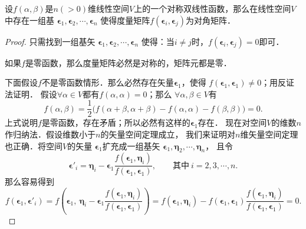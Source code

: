 \begin{theorem}\label{chmla:thm_obm}
    设$f(\alpha,\beta)$是$n(>0)$维线性空间$V$上的一个对称双线性函数，那么在线性空间$V$中存在一组基
    $\boldsymbol{\epsilon}_1,\boldsymbol{\epsilon}_2,\cdots,\boldsymbol{\epsilon}_n$
    使得度量矩阵$f(\boldsymbol{\epsilon}_i,\boldsymbol{\epsilon}_j)$为对角矩阵．
\end{theorem}
\begin{proof}
    只需找到一组基矢
    $\boldsymbol{\epsilon}_1,\boldsymbol{\epsilon}_2,\cdots,\boldsymbol{\epsilon}_n$
    使得：当$i \neq j$时，$f(\boldsymbol{\epsilon}_i,\boldsymbol{\epsilon}_j)=0$即可．

    如果$f$是零函数，那么度量矩阵必然是对称的，矩阵元都是零．

    下面假设$f$不是零函数情形．那么必然存在矢量$\boldsymbol{\epsilon}_1$，使得
    $f(\boldsymbol{\epsilon}_1,\boldsymbol{\epsilon}_1)\neq 0$；用反证法证明．
    假设$\forall \alpha \in V$都有$f(\alpha,\alpha)=0$；那么
    $\forall \alpha ,\beta \in V$有
    \begin{equation}
        f(\alpha,\beta)=\frac{1}{2}\bigl(
        f(\alpha+\beta,\alpha+\beta)-f(\alpha,\alpha)-f(\beta,\beta)
        \bigr) =0.
    \end{equation}
    上式说明$f$是零函数，存在矛盾；所以必然有这样的$\boldsymbol{\epsilon}_1$存在．
    现在对空间$V$的维数$n$作归纳法．假设维数小于$n$的矢量空间定理成立，
    我们来证明对$n$维矢量空间定理也正确．将空间$V$的矢量
    $\boldsymbol{\epsilon}_1$扩充成一组基矢
    $\boldsymbol{\epsilon}_1,\boldsymbol{\eta}_2,\cdots,\boldsymbol{\eta}_n$，
    且令
    \begin{equation*}
        \boldsymbol{\epsilon}'_i = \boldsymbol{\eta}_i - \boldsymbol{\epsilon}_1
        \frac{f(\boldsymbol{\epsilon}_1,\boldsymbol{\eta}_i)}
        {f(\boldsymbol{\epsilon}_1,\boldsymbol{\epsilon}_1)},
        \qquad \text{其中}\ i = 2,3,\cdots,n.
    \end{equation*}
    那么容易得到
    \begin{equation*}
        f(\boldsymbol{\epsilon}_1,\boldsymbol{\epsilon}'_i) =
        f\left(\boldsymbol{\epsilon}_1, \ \boldsymbol{\eta}_i - \boldsymbol{\epsilon}_1
        \frac{f(\boldsymbol{\epsilon}_1,\boldsymbol{\eta}_i)}
        {f(\boldsymbol{\epsilon}_1,\boldsymbol{\epsilon}_1)} \right)
        =f(\boldsymbol{\epsilon}_1,\boldsymbol{\eta}_i) -
        f(\boldsymbol{\epsilon}_1,\boldsymbol{\epsilon}_1)
        \frac{f(\boldsymbol{\epsilon}_1,\boldsymbol{\eta}_i)}
        {f(\boldsymbol{\epsilon}_1,\boldsymbol{\epsilon}_1)}        =0.

\end{equation*}
\end{proof}

